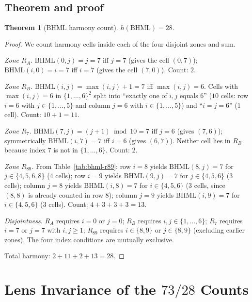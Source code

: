 \documentclass[11pt,reqno]{amsart}
\theoremstyle{plain}
\newtheorem{theorem}{Theorem}
\theoremstyle{definition}
\theoremstyle{remark}
\newcommand{\BHML}{\mathrm{BHML}}
\begin{document}
\subsection{Theorem and proof}

\begin{theorem}[$\BHML$ harmony count]\label{thm:bhml}
$h(\BHML) = 28$.
\end{theorem}

\begin{proof}
We count harmony cells inside each of the four disjoint zones and
sum.

\emph{Zone $R_A$.} $\BHML(0, j) = j = 7$ iff $j = 7$ (gives the
cell $(0, 7)$); $\BHML(i, 0) = i = 7$ iff $i = 7$ (gives the cell
$(7, 0)$). Count: $2$.

\emph{Zone $R_B$.} $\BHML(i, j) = \max(i, j) + 1 = 7$ iff
$\max(i, j) = 6$. Cells with $\max(i, j) = 6$ in
$\{1, \ldots, 6\}^2$ split into ``exactly one of $i, j$ equals
$6$'' ($10$ cells: row $i = 6$ with $j \in \{1, \ldots, 5\}$
and column $j = 6$ with $i \in \{1, \ldots, 5\}$) and
``$i = j = 6$'' ($1$ cell). Count: $10 + 1 = 11$.

\emph{Zone $R_7$.} $\BHML(7, j) = (j + 1) \bmod 10 = 7$ iff
$j = 6$ (gives $(7, 6)$); symmetrically $\BHML(i, 7) = 7$ iff
$i = 6$ (gives $(6, 7)$). Neither cell lies in $R_B$ because
index $7$ is not in $\{1, \ldots, 6\}$. Count: $2$.

\emph{Zone $R_{89}$.} From Table~\ref{tab:bhml-r89}: row $i = 8$
yields $\BHML(8, j) = 7$ for $j \in \{4, 5, 6, 8\}$ (4 cells);
row $i = 9$ yields $\BHML(9, j) = 7$ for $j \in \{4, 5, 6\}$
(3 cells); column $j = 8$ yields $\BHML(i, 8) = 7$ for
$i \in \{4, 5, 6\}$ (3 cells, since $(8, 8)$ is already counted
in row $8$); column $j = 9$ yields $\BHML(i, 9) = 7$ for
$i \in \{4, 5, 6\}$ (3 cells). Count: $4 + 3 + 3 + 3 = 13$.

\emph{Disjointness.} $R_A$ requires $i = 0$ or $j = 0$; $R_B$
requires $i, j \in \{1, \ldots, 6\}$; $R_7$ requires $i = 7$ or
$j = 7$ with $i, j \ge 1$; $R_{89}$ requires $i \in \{8, 9\}$ or
$j \in \{8, 9\}$ (excluding earlier zones). The four index
conditions are mutually exclusive.

Total harmony: $2 + 11 + 2 + 13 = 28$.
\end{proof}

\section{Lens Invariance of the $73/28$ Counts}\label{sec:lens}
\end{document}
